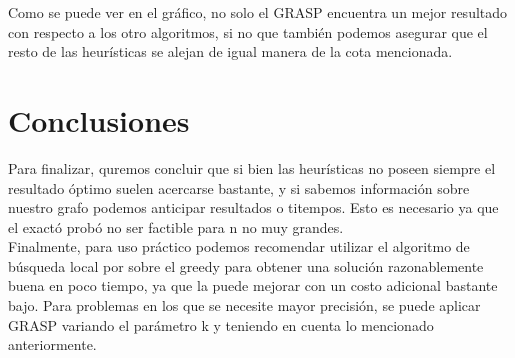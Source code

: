Como se puede ver en el gráfico, no solo el GRASP encuentra un mejor resultado con respecto a los otro algoritmos, si no que también
podemos asegurar que el resto de las heurísticas se alejan de igual manera de la cota mencionada.


\section{Conclusiones}
Para finalizar, quremos concluir que si bien las heurísticas no poseen siempre el resultado óptimo
suelen acercarse bastante, y si sabemos información sobre nuestro grafo podemos anticipar resultados 
o titempos. Esto es necesario ya que el exactó probó no ser factible para n no muy grandes.\\
Finalmente, para uso práctico podemos recomendar utilizar el algoritmo de búsqueda local por sobre el greedy para obtener
una solución razonablemente buena en poco tiempo, ya que la puede mejorar con un costo adicional bastante bajo. Para problemas
en los que se necesite mayor precisión, se puede aplicar GRASP variando el parámetro k y
teniendo en cuenta lo mencionado anteriormente.



